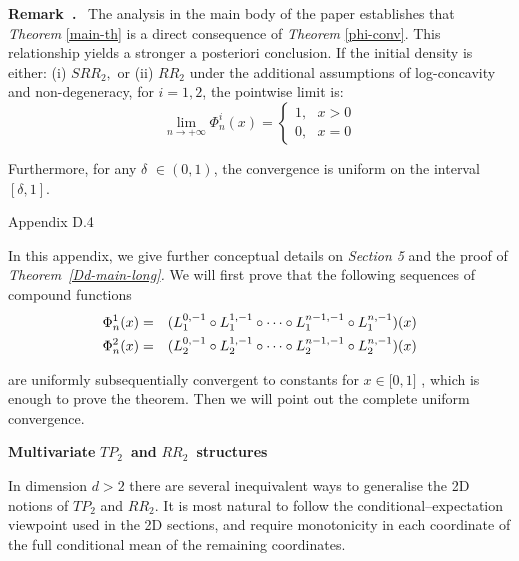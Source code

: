 \documentclass[onecolumn]{article}
\newenvironment{remark}{  \refstepcounter{theorem}  \par\medskip\noindent\textbf{Remark~\thetheorem.}\rmfamily\ }{\par\medskip}
\begin{document}
\begin{remark}
The analysis in the main body of the paper establishes that \textit{Theorem} %
\ref{main-th} is a direct consequence of \textit{Theorem} \ref{phi-conv}.
This relationship yields a stronger a posteriori conclusion. If the initial
density is either: (i) $SRR_{2},$ or (ii) $RR_{2}$ under the additional
assumptions of log-concavity and non-degeneracy, for $i=1,2$, the pointwise
limit is:%
\begin{equation}
\lim_{n\rightarrow +\infty }\Phi _{n}^{i}(x)=\left\{ 
\begin{array}{c}
1,\text{ }x>0 \\ 
0,\text{ }x=0%
\end{array}%
\right.  \label{401a}
\end{equation}

Furthermore, for any $\delta $ $\in (0,1)$, the convergence is uniform on
the interval $[\delta ,1].$
\end{remark}

\begin{flushleft}
{\large Appendix D.4}
\end{flushleft}

In this appendix, we give further conceptual details on \textit{Section 5}
and the proof of \textit{Theorem~\ref{Dd-main-long}. }We will first prove
that the following sequences of compound functions 
\begin{eqnarray}
\Phi _{n}^{1}(x) &=&(L_{1}^{0,-1}\circ L_{1}^{1,-1}\circ \dots \circ
L_{1}^{n-1,-1}\circ L_{1}^{n,-1})(x)  \label{942a} \\
\Phi _{n}^{2}(x) &=&(L_{2}^{0,-1}\circ L_{2}^{1,-1}\circ \dots \circ
L_{2}^{n-1,-1}\circ L_{2}^{n,-1})(x)  \notag
\end{eqnarray}

are uniformly subsequentially convergent to constants for $x\in \lbrack 0,1]$%
, which is enough to prove the theorem. Then we will point out the complete
uniform convergence.

\begin{flushleft}
\textbf{Multivariate }$TP_{2}$\textbf{\ and }$RR_{2}$\textbf{\ structures}
\end{flushleft}

In dimension $d>2$ there are several inequivalent ways to generalise the 2D
notions of $TP_{2}$ and $RR_{2}$. It is most natural to follow the
conditional--expectation viewpoint used in the 2D sections, and require
monotonicity in each coordinate of the full conditional mean of the
remaining coordinates.
\end{document}
